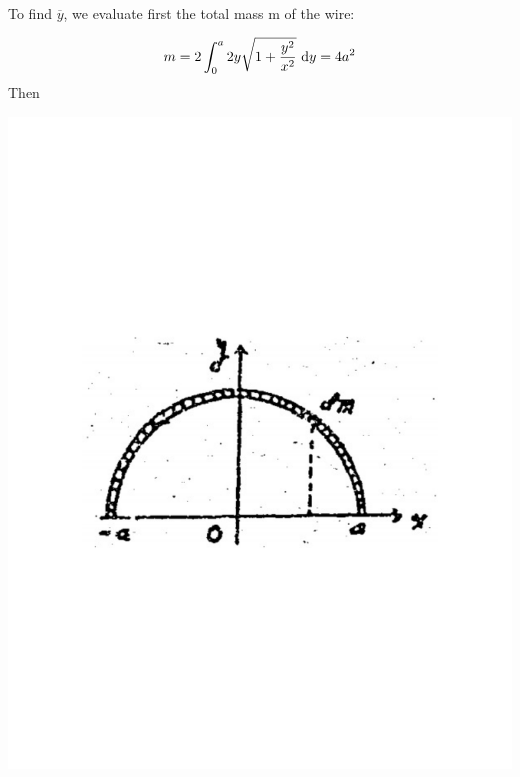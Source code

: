 \documentclass{book}
\begin{document}
	\paragraph{}To find $\overline{y}$, we evaluate first the total mass m of the wire:\\
	\begin{minipage}{0.55\textwidth}
	\begin{align*}
	    m = 2\int_{0}^{a} 2y\sqrt{1 + \frac{y^2}{x^2}} \ \mathrm{d}{y} = 4a^2 
	\end{align*}
	Then
	\end{minipage}
	\begin{minipage}{0.45\textwidth}
	\includegraphics[width=\textwidth]{image}
	\end{minipage}
	
	    
	
	
\end{document}

